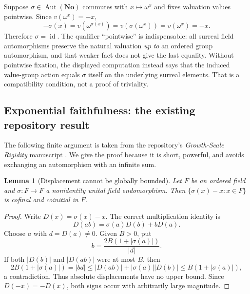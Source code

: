 \documentclass[11pt]{article}
\newtheorem{lemma}[theorem]{Lemma}
\theoremstyle{definition}
\theoremstyle{remark}
\newcommand{\No}{\mathbf{No}}
\newcommand{\id}{\operatorname{id}}
\newcommand{\Aut}{\operatorname{Aut}}
\numberwithin{equation}{section}
\begin{document}
Suppose $\sigma\in\Aut(\No)$ commutes with $x\mapsto\omega^x$ and fixes
valuation values pointwise. Since $v(\omega^x)=-x$,
\[
 -\sigma(x)=v(\omega^{\sigma(x)})
 =v(\sigma(\omega^x))=v(\omega^x)=-x.
\]
Therefore $\sigma=\id$. The qualifier ``pointwise'' is indispensable:
all surreal field automorphisms preserve the natural valuation \emph{up to}
an ordered group automorphism, and that weaker fact does not give the last
equality. Without pointwise fixation, the displayed computation instead
says that the induced value-group action equals $\sigma$ itself on the
underlying surreal elements. That is a compatibility condition, not a
proof of triviality.

\subsection{Exponential faithfulness: the existing repository result}

The following finite argument is taken from the repository's
\emph{Growth-Scale Rigidity} manuscript \cite{RepoRigidity}. We give the
proof because it is short, powerful, and avoids exchanging an automorphism
with an infinite sum.

\begin{lemma}[Displacement cannot be globally bounded]\label{saut:lem:displacement}
Let $F$ be an ordered field and $\sigma:F\to F$ a nonidentity unital field
endomorphism. Then $\{\sigma(x)-x:x\in F\}$ is cofinal and coinitial in $F$.
\end{lemma}
\begin{proof}
Write $D(x)=\sigma(x)-x$. The correct multiplication identity is
\begin{equation}\label{saut:eq:displacement}
 D(ab)=\sigma(a)D(b)+bD(a).
\end{equation}
Choose $a$ with $d=D(a)\ne0$. Given $B>0$, put
\[
 b=\frac{2B(1+|\sigma(a)|)}{|d|}.
\]
If both $|D(b)|$ and $|D(ab)|$ were at most $B$, then
\[
 2B(1+|\sigma(a)|)=|bd|
 \le |D(ab)|+|\sigma(a)||D(b)|
 \le B(1+|\sigma(a)|),
\]
a contradiction. Thus absolute displacements have no upper bound.
Since $D(-x)=-D(x)$, both signs occur with arbitrarily large magnitude.
\end{proof}
\end{document}
